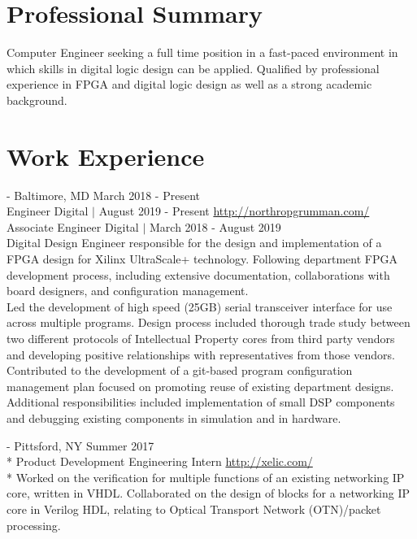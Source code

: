 \documentclass[a4paper,margin,line]{resume}
\newcommand{\rurl}[1]{\hfill {\footnotesize \url{#1}}}
\newcommand{\rdate}[1]{\hfill {\small #1}}
\renewcommand{\employer}[5]{ \item[#1] - #2 \rdate{#3} \\* #4 \rurl{#5} \\*}
\newcommand{\employermult}[3]{ \item[#1] - #2 \rdate{#3} \\}
\begin{document}
\begin{resume}
\section{\mysidestyle Professional Summary}
    Computer Engineer seeking a full time position in a fast-paced environment in which skills in digital logic design can be applied. Qualified by professional experience in FPGA and digital logic design as well as a strong academic background.

\section{\mysidestyle Work Experience}
    \begin{asparadesc}
        \employermult{Northrop Grumman Corporation}{Baltimore, MD}{March 2018 - Present}
        {Engineer Digital $\mid$ August 2019 - Present} \rurl{http://northropgrumman.com/}\\
        {Associate Engineer Digital $\mid$ March 2018 - August 2019} \smallskip\\
        \small Digital Design Engineer responsible for the design and implementation of a FPGA design for Xilinx UltraScale+ technology. Following department FPGA development process, including extensive documentation, collaborations with board designers, and configuration management.\smallskip\\
        Led the development of high speed (25GB) serial transceiver interface for use across multiple programs. Design process included thorough trade study between two different protocols of Intellectual Property cores from third party vendors and developing positive relationships with representatives from those vendors.\smallskip\\
        Contributed to the development of a git-based program configuration management plan focused on promoting reuse of existing department designs.\smallskip\\
        Additional responsibilities included implementation of small DSP components and debugging existing components in simulation and in hardware.\\        
        \employer{Xelic, Inc.}{Pittsford, NY}{Summer 2017}{Product Development Engineering Intern}
        {http://xelic.com/}
        \small Worked on the verification for multiple functions of an existing networking IP core, written in VHDL. Collaborated on the design of blocks for a networking IP core in Verilog HDL, relating to Optical Transport Network (OTN)/packet processing.

\end{asparadesc}
\end{resume}
\end{document}
